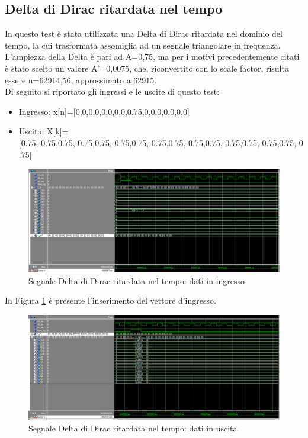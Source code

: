 \documentclass[a4paper, titlepage]{article}
\begin{document}
\subsection{Delta di Dirac ritardata nel tempo}
In questo test è stata utilizzata una Delta di Dirac ritardata nel dominio del tempo, la cui trasformata assomiglia ad un segnale triangolare in frequenza.\\L'ampiezza della Delta è pari ad A=0,75, ma per i motivi precedentemente citati è stato scelto un valore A'=0,0075, che, riconvertito con lo scale factor, risulta essere n=62914,56, approssimato a 62915.\\Di seguito si riportato gli ingressi e le uscite di questo test:
\begin{itemize}
    \item Ingresso: x[n]=[0,0,0,0,0,0,0,0,0.75,0,0,0,0,0,0,0]
    \item Uscita:   X[k]=[0.75,-0.75,0.75,-0.75,0.75,-0.75,0.75,-0.75,0.75,-0.75,0.75,-0.75,0.75,-0.75,0.75,-0.75]
\end{itemize}
\begin{figure}[h]
    \centering
    \includegraphics[scale=0.45]{test_delta_0.75/fs_d075_in.png}
    \caption{Segnale Delta di Dirac ritardata nel tempo: dati in ingresso}
    \label{fig:delta75_in}
\end{figure}
In Figura \ref{fig:delta75_in} è presente l'inserimento del vettore d'ingresso.
\pagebreak
\begin{figure}[h]
    \centering
    \includegraphics[scale=0.45]{test_delta_0.75/fs_d075_out.png}
    \caption{Segnale Delta di Dirac ritardata nel tempo: dati in uscita}
    \label{fig:delta75_out}
\end{figure}\\
\end{document}
